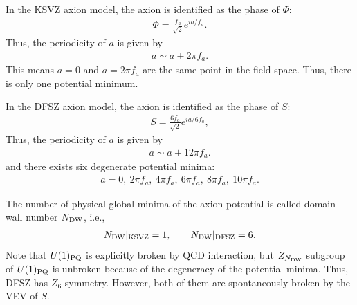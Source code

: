 \documentclass[11pt,a4paper]{article}
\begin{document}
In the KSVZ axion model, the axion is identified as the phase of $\Phi$:
\begin{align}
    \Phi = \frac{f_a}{\sqrt{2}} e^{i a/f_a}.
\end{align}
Thus, the periodicity of $a$ is given by
\begin{align}
    a \sim a + 2\pi f_a.
\end{align}
This means $a = 0$ and $a = 2\pi f_a$ are the same point in the field space. Thus, there is only one potential minimum.


In the DFSZ axion model, the axion is identified as the phase of $S$:
\begin{align}
    S = \frac{6f_a}{\sqrt{2}} e^{i a/6f_a},
\end{align}
Thus, the periodicity of $a$ is given by
\begin{align}
    a \sim a + 12\pi f_a.
\end{align}
and there exists six degenerate potential minima:
\begin{align}
    a = 0, ~2\pi f_a, ~4\pi f_a, ~6\pi f_a, ~8\pi f_a, ~10\pi f_a.
\end{align}

The number of physical global minima of the axion potential is called domain wall number $N_{\rm DW}$, i.e., 
\begin{align}
    N_{\rm DW} |_{\rm KSVZ} = 1, \qquad
    N_{\rm DW} |_{\rm DFSZ} = 6.
\end{align}
Note that $U(1)_{\rm PQ}$ is explicitly broken by QCD interaction, but $Z_{N_{\rm DW}}$ subgroup of $U(1)_{\rm PQ}$ is unbroken because of the degeneracy of the potential minima. Thus, DFSZ has $Z_6$ symmetry. However, both of them are spontaneously broken by the VEV of $S$.
\end{document}
